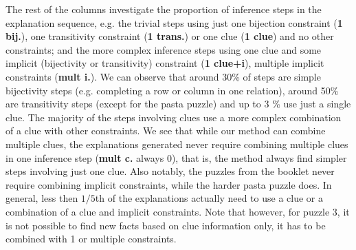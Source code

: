 The rest of the columns investigate the proportion of inference steps in the explanation sequence, e.g. the trivial steps using just one bijection constraint (\textbf{1 bij.}), one transitivity constraint (\textbf{1 trans.}) or one clue (\textbf{1 clue}) and no other constraints; and the more complex inference steps using one clue and some implicit (bijectivity or transitivity) constraint (\textbf{1 clue+i}), multiple implicit constraints (\textbf{mult i.}). 
We can observe that around 30\% of steps are simple bijectivity steps (e.g. completing a row or column in one relation), around 50\% are transitivity steps (except for the pasta puzzle) and up to 3 \% use just a single clue. 
The majority of the steps involving clues use a more complex combination of a clue with other constraints. 
We see that while our method can combine multiple clues, the explanations generated never require combining multiple clues in one inference step (\textbf{mult c.} always 0), that is, the method always find simpler steps involving just one clue. 
Also notably, the puzzles from the booklet never require combining implicit constraints, while the harder pasta puzzle does. 
In general, less then $1/5$th of the explanations actually need to use a clue or a combination of a clue and implicit constraints.
Note that however, for puzzle 3, it is not possible to find new facts based on clue information only, it has to be combined with 1 or multiple constraints.


